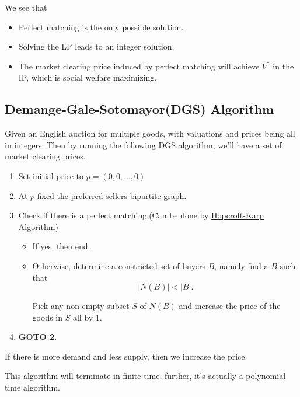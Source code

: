 \begin{remark}
	We see that
	\begin{itemize}
		\item Perfect matching is the only possible solution.
		\item Solving the LP leads to an integer solution.
		\item The market clearing price induced by perfect matching will achieve \(V^{*}\) in the IP, which is social welfare maximizing.
	\end{itemize}
\end{remark}

\subsection{Demange-Gale-Sotomayor(DGS) Algorithm}
Given an English auction for multiple goods, with valuations and prices being all in integers. Then by running the following DGS algorithm, we'll have
a set of market clearing prices.
\begin{enumerate}
	\item Set initial price to \(p = (0, 0, \ldots , 0 )\)
	\item At \(p\) fixed the preferred sellers bipartite graph.
	\item Check if there is a perfect matching.(Can be done by \hyperref[Hopcroft-Karp Algorithm]{Hopcroft-Karp Algorithm})
	      \begin{itemize}
		      \item If yes, then end.
		      \item Otherwise, determine a constricted set of buyers \(B\), namely find a \(B\) such that
		            \[
			            \left\vert N(B) \right\vert < \left\vert B \right\vert.
		            \]

		            Pick any non-empty subset \(S\) of \(N(B)\) and increase the price of the goods in \(S\) all by \(1\).
	      \end{itemize}
	\item \textbf{GOTO 2}.
\end{enumerate}

\begin{intuition}
	If there is more demand and less supply, then we increase the price.
\end{intuition}

\begin{remark}
	This algorithm will terminate in finite-time, further, it's actually a polynomial time algorithm.
\end{remark}

